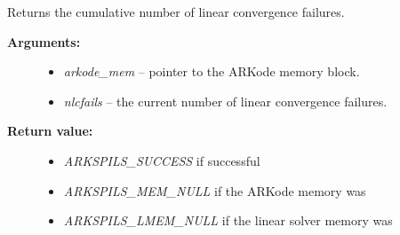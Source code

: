 \documentclass[letterpaper,10pt,english]{sphinxmanual}
\begin{document}
\begin{fulllineitems}
\label{c_interface/User_callable:c.ARKSpilsGetNumConvFails}
Returns the cumulative number of linear convergence failures.
\begin{description}
\item[{\textbf{Arguments:}}] \leavevmode\begin{itemize}
\item {} 
\emph{arkode\_mem} -- pointer to the ARKode memory block.

\item {} 
\emph{nlcfails} -- the current number of linear convergence failures.

\end{itemize}

\item[{\textbf{Return value:}}] \leavevmode\begin{itemize}
\item {} 
\emph{ARKSPILS\_SUCCESS} if successful

\item {} 
\emph{ARKSPILS\_MEM\_NULL} if the ARKode memory was 

\item {} 
\emph{ARKSPILS\_LMEM\_NULL} if the linear solver memory was 

\end{itemize}

\end{description}

\end{fulllineitems}

\end{document}
